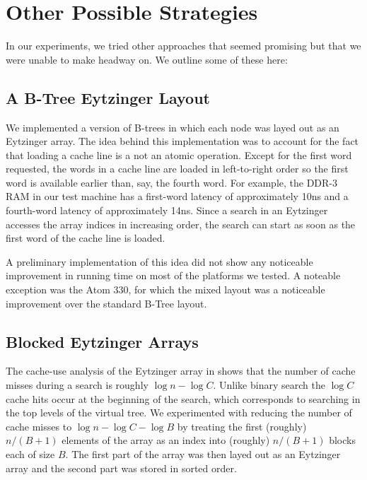 \documentclass{patmorin}
\begin{document}
\section{Other Possible Strategies}

In our experiments, we tried other approaches that seemed promising but that we were unable to make headway on. We outline some of these here:

\subsection{A B-Tree Eytzinger Layout}

We implemented a version of B-trees in which each node was layed out as an
Eytzinger array.  The idea behind this implementation was to account for
the fact that loading a cache line is a not an atomic operation. Except
for the first word requested, the words in a cache line are loaded in
left-to-right order so the first word is available earlier than, say,
the fourth word. For example, the DDR-3 RAM in our test machine has a
first-word latency of approximately 10ns and a fourth-word latency of
approximately 14ns. Since a search in an Eytzinger accesses the array
indices in increasing order, the search can start as soon as the first
word of the cache line is loaded.

A preliminary implementation of this idea did not show any noticeable
improvement in running time on most of the platforms we tested. A noteable
exception was the Atom 330, for which the mixed layout was a noticeable
improvement over the standard B-Tree layout.

\subsection{Blocked Eytzinger Arrays}

The cache-use analysis of the Eytzinger array in
 shows that the number of cache misses during
a search is roughly $\log n-\log C$. Unlike binary search the $\log C$
cache hits occur at the beginning of the search, which corresponds to
searching in the top levels of the virtual tree.  We experimented with
reducing the number of cache misses to $\log n -\log C - \log B$ by
treating the first (roughly) $n/(B+1)$ elements of the array as an index
into (roughly) $n/(B+1)$ blocks each of size $B$. The first part of the
 array was then layed out as an Eytzinger array and the second part was
 stored in sorted order.
\end{document}
